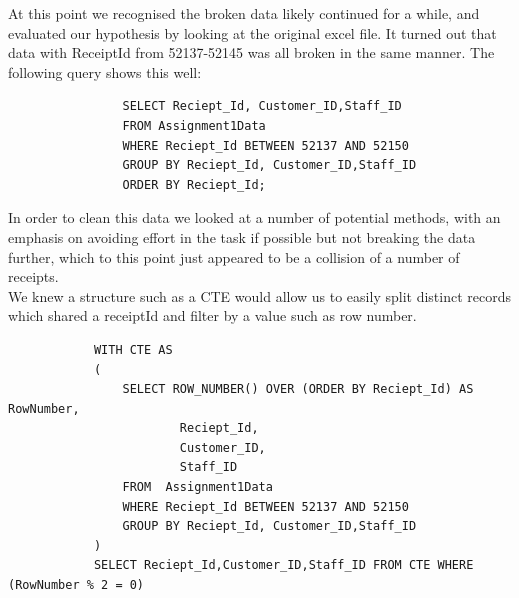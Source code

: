 \documentclass{article}
\begin{document}
            At this point we recognised the broken data likely continued for a while, and 
            evaluated our hypothesis by looking at the original excel file. It turned
            out that data with ReceiptId from 52137-52145 was all broken in the same manner.
            The following query shows this well:

            \begin{lstlisting}
                SELECT Reciept_Id, Customer_ID,Staff_ID 
                FROM Assignment1Data 
                WHERE Reciept_Id BETWEEN 52137 AND 52150
                GROUP BY Reciept_Id, Customer_ID,Staff_ID 
                ORDER BY Reciept_Id;
            \end{lstlisting}

            In order to clean this data we looked at a number of potential methods, with an 
            emphasis on avoiding effort in the task if possible but not breaking the data further,
            which to this point just appeared to be a collision of a number of receipts.
            \\
            We knew a structure such as a CTE\cite{CTE} would allow us to easily split
            distinct records which shared a receiptId and filter by a value such as row number.

            \begin{lstlisting}
            WITH CTE AS
            (
                SELECT ROW_NUMBER() OVER (ORDER BY Reciept_Id) AS RowNumber,
                        Reciept_Id,
                        Customer_ID,
                        Staff_ID
                FROM  Assignment1Data
                WHERE Reciept_Id BETWEEN 52137 AND 52150
                GROUP BY Reciept_Id, Customer_ID,Staff_ID 
            )
            SELECT Reciept_Id,Customer_ID,Staff_ID FROM CTE WHERE (RowNumber % 2 = 0)
            \end{lstlisting}
\end{document}
